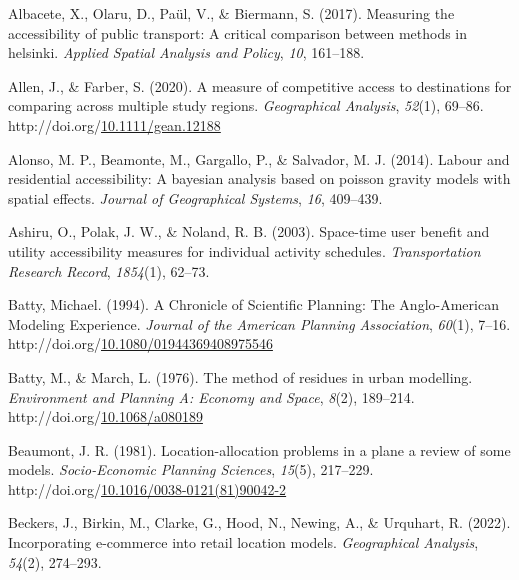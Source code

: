 \documentclass[
11pt, %
oneside, %
english, %
singlespacing, %
]{macthesis} %
\newlength{\cslhangindent}
\newenvironment{CSLReferences}[2] %
{\begin{list}{}{%
	\setlength{\itemindent}{0pt}
	\setlength{\leftmargin}{0pt}
	\setlength{\parsep}{0pt}
	\ifodd #1
	\setlength{\leftmargin}{\cslhangindent}
	\setlength{\itemindent}{-1\cslhangindent}
	\fi
	\setlength{\itemsep}{#2\baselineskip}}}
{\end{list}}
\begin{document}
\label{refs}
\begin{CSLReferences}{1}{0}
Albacete, X., Olaru, D., Paül, V., \& Biermann, S. (2017). Measuring the accessibility of public transport: A critical comparison between methods in helsinki. \emph{Applied Spatial Analysis and Policy}, \emph{10}, 161--188.

Allen, J., \& Farber, S. (2020). A measure of competitive access to destinations for comparing across multiple study regions. \emph{Geographical Analysis}, \emph{52}(1), 69--86. http://doi.org/\href{https://doi.org/10.1111/gean.12188}{10.1111/gean.12188}

Alonso, M. P., Beamonte, M., Gargallo, P., \& Salvador, M. J. (2014). Labour and residential accessibility: A bayesian analysis based on poisson gravity models with spatial effects. \emph{Journal of Geographical Systems}, \emph{16}, 409--439.

Ashiru, O., Polak, J. W., \& Noland, R. B. (2003). Space-time user benefit and utility accessibility measures for individual activity schedules. \emph{Transportation Research Record}, \emph{1854}(1), 62--73.

Batty, Michael. (1994). A {Chronicle} of {Scientific} {Planning}: {The} {Anglo}-{American} {Modeling} {Experience}. \emph{Journal of the American Planning Association}, \emph{60}(1), 7--16. http://doi.org/\href{https://doi.org/10.1080/01944369408975546}{10.1080/01944369408975546}

Batty, M., \& March, L. (1976). The method of residues in urban modelling. \emph{Environment and Planning A: Economy and Space}, \emph{8}(2), 189--214. http://doi.org/\href{https://doi.org/10.1068/a080189}{10.1068/a080189}

Beaumont, J. R. (1981). Location-allocation problems in a plane a review of some models. \emph{Socio-Economic Planning Sciences}, \emph{15}(5), 217--229. http://doi.org/\href{https://doi.org/10.1016/0038-0121(81)90042-2}{10.1016/0038-0121(81)90042-2}

Beckers, J., Birkin, M., Clarke, G., Hood, N., Newing, A., \& Urquhart, R. (2022). Incorporating e-commerce into retail location models. \emph{Geographical Analysis}, \emph{54}(2), 274--293.


\end{CSLReferences}
\end{document}
